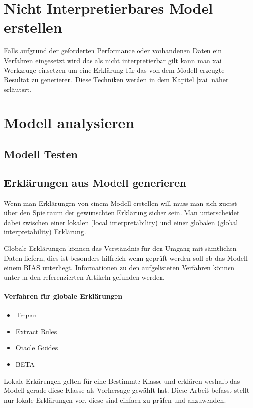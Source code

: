 \documentclass[
  12pt, %
  a4paper, %
  oneside, %
  openany, 
  numbers=noenddot, %
  BCOR=5mm, %
  parskip=half*, %
  thesis, %
]{bfhbook}
\begin{document}
\section{Nicht Interpretierbares Model erstellen}
Falls aufgrund der geforderten Performance oder vorhandenen Daten ein Verfahren eingesetzt wird das als nicht interpretierbar gilt kann man \Gls{xai} Werkzeuge einsetzen um eine Erklärung für das von dem Modell erzeugte Resultat zu generieren. Diese Techniken werden in dem Kapitel \ref{xai} näher erläutert.

\section{Modell analysieren}

\subsection{Modell Testen}

\subsection{Erklärungen aus Modell generieren}
Wenn man Erklärungen von einem Modell erstellen will muss man sich zuerst über den Spielraum der gewünschten Erklärung sicher sein. Man unterscheidet dabei zwischen einer lokalen (local interpretability) und einer globalen (global interpretability) Erklärung.

Globale Erklärungen können das Verständnis für den Umgang mit sämtlichen Daten liefern, dies ist besonders hilfreich wenn geprüft werden soll ob das Modell einem \Gls{BIAS} unterliegt. Informationen zu den aufgelisteten Verfahren können unter in den referenzierten Artikeln gefunden werden.

\paragraph*{Verfahren für globale Erklärungen}
\begin{itemize}
	\item Trepan \parencite{10.5555/2998828.2998832}
	\item Extract Rules \parencite{Craven1994}
	\item Oracle Guides \parencite{Johansson2009}
	\item BETA \parencite{Lakkaraju2017}
\end{itemize}

Lokale Erkärungen gelten für eine Bestimmte Klasse und erklären weshalb das Modell gerade diese Klasse als Vorhersage gewählt hat. Diese Arbeit befasst stellt nur lokale Erklärungen vor, diese sind einfach zu prüfen und anzuwenden.
\end{document}
